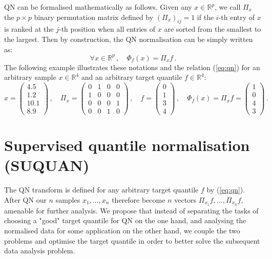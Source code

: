 \documentclass{article}
\newcommand{\RR}{\mathbb{R}} %
\begin{document}
QN can be formalised mathematically as follows. Given any $x\in\RR^p$, we call $\Pi_x$ the $p\times p$ binary permutation matrix defined by $(\Pi_x)_{ij}=1$ if the $i$-th entry of $x$ is ranked at the $j$-th position when all entries of $x$ are sorted from the smallest to the largest. Then by construction, the QN normalisation can be simply written as:
\begin{equation}\label{eq:qn}
\forall x\in\RR^p\,,\quad \Phi_f(x) = \Pi_x f \,.
\end{equation}
The following example illustrates these notations and the relation (\ref{eq:qn}) for an arbitrary sample $x\in\RR^4$ and an arbitrary target quantile $f\in\RR^4$:
$$
x=\left(\begin{array}{c}4.5 \\1.2 \\10.1 \\8.9\end{array}\right) \,,\quad \Pi_x = \left(\begin{array}{cccc}0 & 1 & 0 & 0 \\1 & 0 & 0 & 0 \\0 & 0 & 0 & 1 \\0 & 0 & 1 & 0\end{array}\right) \,,\quad f=\left(\begin{array}{c}0 \\1 \\3 \\4\end{array}\right) \,, \quad \Phi_f(x) = \Pi_x f =\left(\begin{array}{c}1 \\0 \\4 \\3\end{array}\right) \, .
$$

\section{Supervised quantile normalisation (SUQUAN)}

The QN transform is defined for any arbitrary target quantile $f$ by (\ref{eq:qn}). After QN our $n$ samples $x_1, \ldots, x_n$ therefore become $n$ vectors $\Pi_{x_1} f , \ldots , \Pi_{x_n} f$, amenable for further analysis. We propose that instead of separating the tasks of choosing a "good" target quantile for QN on the one hand, and  analysing the normalised data for some application on the other hand, we couple the two problems and optimise the target quantile in order to better solve the subsequent data analysis problem. 
\end{document}
